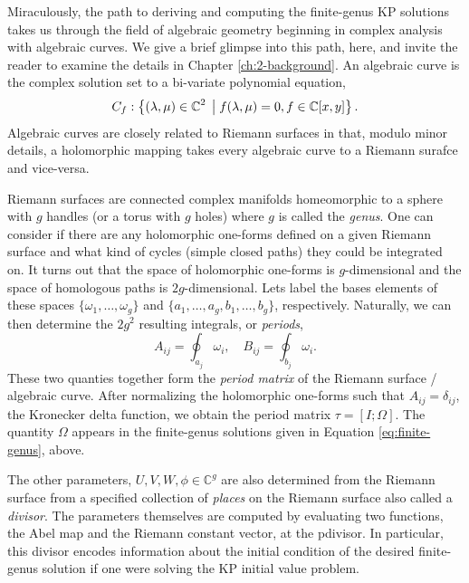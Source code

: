 Miraculously, the path to deriving and computing the finite-genus KP solutions
takes us through the field of algebraic geometry beginning in complex analysis
with algebraic curves. We give a brief glimpse into this path, here, and invite
the reader to examine the details in Chapter \ref{ch:2-background}. An algebraic
curve is the complex solution set to a bi-variate polynomial equation,
\begin{equation}
  C_f: \left\{
    (\lambda, \mu) \in \operatorname{\mathbb{C}}^2
    \; \big| \;
    f(\lambda, \mu) = 0, f \in \operatorname{\mathbb{C}}[x,y]
  \right\}.
\end{equation}
Algebraic curves are closely related to Riemann surfaces in that, modulo minor
details, a holomorphic mapping takes every algebraic curve to a Riemann surafce
and vice-versa.

Riemann surfaces are connected complex manifolds homeomorphic to a sphere with
$g$ handles (or a torus with $g$ holes) where $g$ is called the {\it genus}. One
can consider if there are any holomorphic one-forms defined on a given Riemann
surface and what kind of cycles (simple closed paths) they could be integrated
on. It turns out that the space of holomorphic one-forms is $g$-dimensional and
the space of homologous paths is $2g$-dimensional. Lets label the bases elements
of these spaces $\{\omega_1, \ldots, \omega_g\}$ and $\{ a_1, \ldots, a_g,
b_1, \ldots, b_g\}$, respectively. Naturally, we can then determine the $2g^2$
resulting integrals, or {\it periods},
\begin{equation}
  A_{ij} = \oint_{a_j} \omega_i, \quad B_{ij} = \oint_{b_j} \omega_i.
\end{equation}
These two quanties together form the {\it period matrix} of the Riemann surface
/ algebraic curve. After normalizing the holomorphic one-forms such that $A_{ij}
= \delta_{ij}$, the Kronecker delta function, we obtain the period matrix $\tau
= [I; \Omega]$. The quantity $\Omega$ appears in the finite-genus solutions
given in Equation \ref{eq:finite-genus}, above.

The other parameters, $U, V, W, \phi \in \mathbb{C}^g$ are also determined from
the Riemann surface from a specified collection of {\it places} on the Riemann
surface also called a {\it divisor}. The parameters themselves are computed by
evaluating two functions, the Abel map and the Riemann constant vector, at the
pdivisor. In particular, this divisor encodes information about the initial
condition of the desired finite-genus solution if one were solving the KP
initial value problem.

